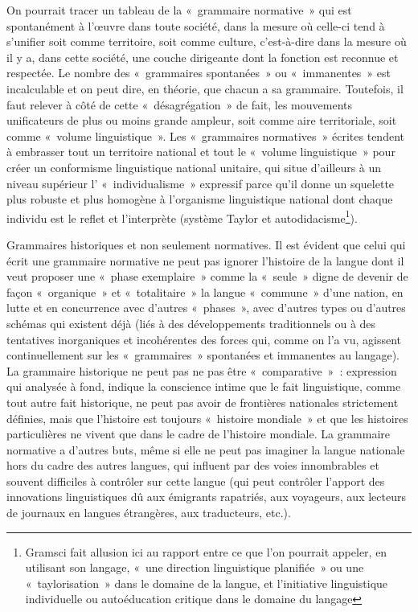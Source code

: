 \documentclass[french,twoside]{book} %
\begin{document}
On pourrait tracer un tableau de la « grammaire normative » qui est spontanément à l’œuvre dans toute société, dans la mesure où celle-ci tend à s’unifier soit comme territoire, soit comme culture, c’est-à-dire dans la mesure où il y a, dans cette société, une couche dirigeante dont la fonction est reconnue et respectée. Le nombre des « grammaires spontanées » ou « immanentes » est incalculable et on peut dire, en théorie, que chacun a sa grammaire. Toutefois, il faut relever à côté de cette « désagrégation » de fait, les mouvements unificateurs de plus ou moins grande ampleur, soit comme aire territoriale, soit comme « volume linguistique ». Les « grammaires normatives » écrites tendent à embrasser tout un territoire national et tout le « volume linguistique » pour créer un conformisme linguistique national unitaire, qui situe d’ailleurs à un niveau supérieur l’ « individualisme » expressif parce qu’il donne un squelette plus robuste et plus homogène à l’organisme linguistique national dont chaque individu est le reflet et l’interprète (système Taylor et autodidacisme\footnote{Gramsci fait allusion ici au rapport entre ce que l’on pourrait appeler, en utilisant son langage, « une direction linguistique planifiée » ou une « taylorisation » dans le domaine de la langue, et l’initiative linguistique individuelle ou autoéducation critique dans le domaine du langage}).\par
Grammaires historiques et non seulement normatives. Il est évident que celui qui écrit une grammaire normative ne peut pas ignorer l’histoire de la langue dont il veut proposer une « phase exemplaire » comme la « seule » digne de devenir de façon « organique » et « totalitaire » la langue « commune » d’une nation, en lutte et en concurrence avec d’autres « phases », avec d’autres types ou d’autres schémas qui existent déjà (liés à des développements traditionnels ou à des tentatives inorganiques et incohérentes des forces qui, comme on l’a vu, agissent continuellement sur les « grammaires » spontanées et immanentes au langage). La grammaire historique ne peut pas ne pas être « comparative » : expression qui analysée à fond, indique la conscience intime que le fait linguistique, comme tout autre fait historique, ne peut pas avoir de frontières nationales strictement définies, mais que l’histoire est toujours « histoire mondiale » et que les histoires particulières ne vivent que dans le cadre de l’histoire mondiale. La grammaire normative a d’autres buts, même si elle ne peut pas imaginer la langue nationale hors du cadre des autres langues, qui influent par des voies innombrables et souvent difficiles à contrôler sur cette langue (qui peut contrôler l’apport des innovations linguistiques dû aux émigrants rapatriés, aux voyageurs, aux lecteurs de journaux en langues étrangères, aux traducteurs, etc.).\par
\end{document}
